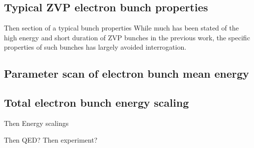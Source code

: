 \subsection{Typical ZVP electron bunch properties}
Then section of a typical bunch properties 
While much has been stated of the high energy and short duration of ZVP bunches in the previous work, the specific properties of such bunches has largely avoided interrogation.

\subsection{Parameter scan of electron bunch mean energy}

\subsection{Total electron bunch energy scaling}


Then Energy scalings

Then QED?
Then experiment?



